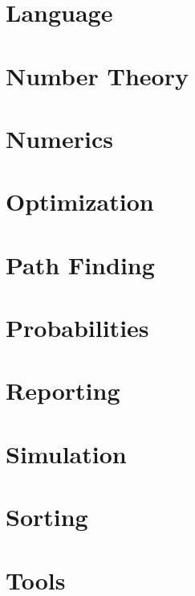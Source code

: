 \documentclass[10pt,a4paper]{report}
\begin{document}
\chapter{Language}
 

\chapter{Number Theory}

\chapter{Numerics}

\chapter{Optimization}

\chapter{Path Finding}

\chapter{Probabilities}

\chapter{Reporting}

\chapter{Simulation}

\chapter{Sorting}

\chapter{Tools}

\newpage
{}

\begin{small}
 \printindex
\end{small}

\end{document}
